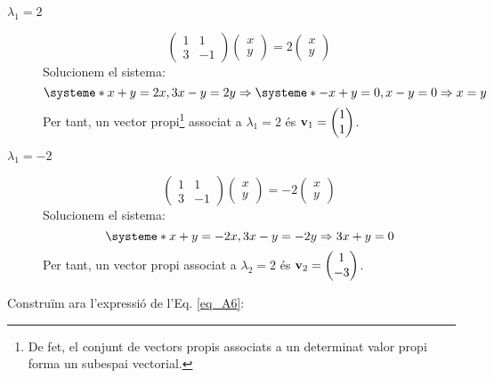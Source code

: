 \begin{description}
  \item[$\boxed{\lambda_1=2}$] 
  \[
    \begin{pmatrix}1&1\\3&-1\end{pmatrix}
  \begin{pmatrix}x\\y\end{pmatrix}=2\begin{pmatrix}x\\y\end{pmatrix}
  \]
  Solucionem el sistema:
  \[
    \systeme*{x+y=2x,3x-y=2y} \Rightarrow \systeme*{-x+y=0,x-y=0} \Rightarrow x=y
  \]
  Per tant, un vector propi\footnote{De fet, el conjunt de vectors propis associats a un determinat valor propi forma un subespai vectorial.} associat a $\lambda_1=2$ és $\textbf{v}_1=\begin{pmatrix}1\\1\end{pmatrix}$. 
  \item[$\boxed{\lambda_1=-2}$] 
  \[
    \begin{pmatrix}1&1\\3&-1\end{pmatrix}
  \begin{pmatrix}x\\y\end{pmatrix}=-2\begin{pmatrix}x\\y\end{pmatrix}
  \]
  Solucionem el sistema:
  \[
    \systeme*{x+y=-2x,3x-y=-2y} \Rightarrow 3x+y=0
  \]
  Per tant, un vector propi associat a $\lambda_2=2$ és $\textbf{v}_2=\begin{pmatrix}1\\-3\end{pmatrix}$. 
\end{description}

Construïm ara l'expressió de l'Eq. \ref{eq_A6}:

